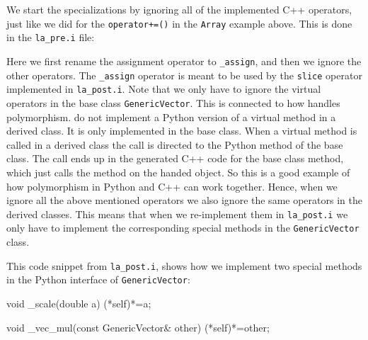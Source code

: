 \begin{code}
We start the specializations by ignoring all of the implemented C++ operators, just like we did for the \texttt{operator+=()} in the \texttt{Array} example above. This is done in the \texttt{la\_pre.i} file:
\begin{code}
\end{code}
Here we first rename the assignment operator to \texttt{\_assign}, and then we ignore the other operators. The \texttt{\_assign} operator is meant to be used by the \texttt{slice} operator implemented in \texttt{la\_post.i}. Note that we only have to ignore the virtual operators in the base class \texttt{GenericVector}. This is connected to how \swig handles polymorphism. \swig do not implement a Python version of a virtual method in a derived class. It is only implemented in the base class. When a virtual method is called in a derived class the call is directed to the Python method of the base class. The call ends up in the \swig generated C++ code for the base class method, which just calls the method on the handed object. So this is a good example of how polymorphism in Python and C++ can work together. Hence, when we ignore all the above mentioned operators we also ignore the same operators in the derived classes. This means that when we re-implement them in \texttt{la\_post.i} we only have to implement the corresponding special methods in the \texttt{GenericVector} class. \par

This code snippet from \texttt{la\_post.i}, shows how we implement two special methods in the Python interface of \texttt{GenericVector}:
\begin{code}
  void _scale(double a)
  {(*self)*=a;}

  void _vec_mul(const GenericVector& other)
  {(*self)*=other;}


\end{code}
\end{code}
